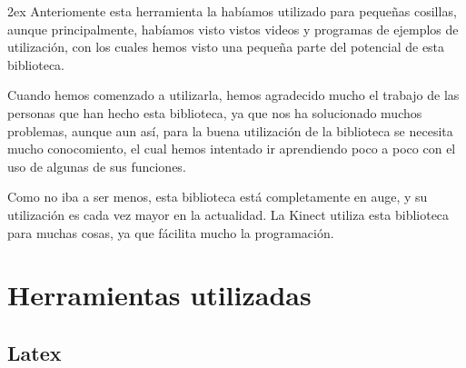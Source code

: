 \documentclass[12pt,a4paper]{report}
\begin{document}
\parskip 2ex
Anteriomente esta herramienta la habíamos utilizado para pequeñas cosillas,
aunque principalmente, habíamos visto vistos videos y programas de ejemplos de
utilización, con los cuales hemos visto una pequeña parte del potencial de esta
biblioteca. 

Cuando hemos comenzado a utilizarla, hemos agradecido mucho el trabajo de las
personas que han hecho esta biblioteca, ya que nos ha solucionado muchos
problemas, aunque aun así, para la buena utilización de la biblioteca se
necesita mucho conocomiento, el cual hemos intentado ir aprendiendo poco a poco
con el uso de algunas de sus funciones.

Como no iba a ser menos, esta biblioteca está completamente en auge, y su
utilización es cada vez mayor en la actualidad. La Kinect utiliza esta
biblioteca para muchas cosas, ya que fácilita mucho la programación. 

\chapter{Herramientas utilizadas}
\section{Latex}
\end{document}
